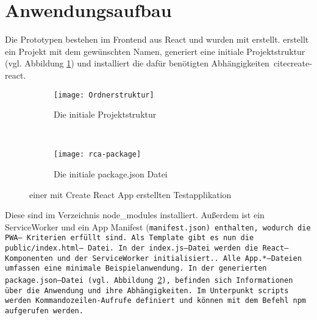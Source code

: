 \section{Anwendungsaufbau}
Die Prototypen bestehen im Frontend aus React und wurden mit  erstellt.  erstellt ein Projekt mit dem gewünschten Namen, generiert eine initiale Projektstruktur (vgl. Abbildung \ref{fig:init}) und installiert die dafür benötigten Abhängigkeiten~cite{create-react}.
\begin{figure}[H]
  \centering
  \begin{subfigure}[t]{0.4\textwidth}
          \texttt{[image: Ordnerstruktur]}
          \caption{Die initiale Projektstruktur}
          \label{fig:init}
  \end{subfigure}
  ~ 
  \begin{subfigure}[t]{0.4\textwidth}
          \texttt{[image: rca-package]}
          \caption{Die initiale package.json Datei}
          \label{fig:init2}
  \end{subfigure}
  \grayRule
  \caption[Create React App: initiale Testapplikation]{einer mit Create React App erstellten Testapplikation}
  \label{fig:create-react-app}
\end{figure}
Diese sind im Verzeichnis node\_modules installiert.
Außerdem ist ein ServiceWorker und ein App Manifest (\tt{manifest.json}) enthalten, wodurch die \gls{PWA}-- Kriterien erfüllt sind.
Als Template gibt es nun die \tt{public/index.html}-- Datei. In der \tt{index.js}--Datei werden die React--Komponenten und der ServiceWorker initialisiert.. Alle \tt{App.*}--Dateien umfassen eine minimale Beispielanwendung.
In der generierten \tt{package.json}--Datei (vgl. Abbildung \ref{fig:init2}), befinden sich Informationen über die Anwendung und ihre Abhängigkeiten. Im Unterpunkt \tt{scripts} werden Kommandozeilen-Aufrufe definiert und können mit dem Befehl \tt{npm} aufgerufen werden.
%
%

%
%
%
